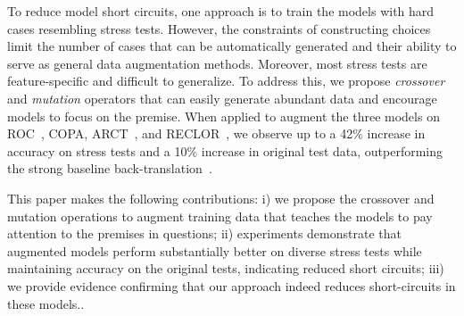 %


To reduce model short circuits, one approach is to train the models 
with hard cases resembling stress tests. 
However, the constraints of constructing choices limit 
the number of cases that can be automatically generated 
and their ability to serve as general data augmentation methods. 
Moreover, most stress tests are feature-specific and difficult to generalize. 
To address this, we propose \textit{crossover} and \textit{mutation} operators 
that can easily generate abundant data and encourage models to focus on the premise. 
When applied to augment the three models on ROC~\cite{roc2017}, COPA, ARCT~\cite{arct2018}, 
and RECLOR~\cite{yu2020reclor}, we observe up to a 42\% increase in accuracy on 
stress tests and a 10\% increase in original test data, 
outperforming the strong baseline back-translation~\cite{back2019}.


This paper makes the following contributions:
i) we propose the crossover and mutation operations
to augment training data that teaches the models to pay attention to
the premises in questions; ii) experiments demonstrate that 
augmented models perform substantially better on diverse stress tests 
while maintaining accuracy on the original tests, indicating reduced short circuits;
iii) we provide evidence confirming that our approach indeed reduces short-circuits in these models..

